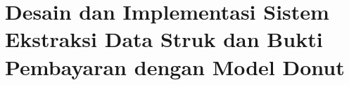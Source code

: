 \chapter{Desain dan Implementasi Sistem Ekstraksi Data Struk dan Bukti Pembayaran dengan Model Donut}
\label{chapter:desain-implementasi}






